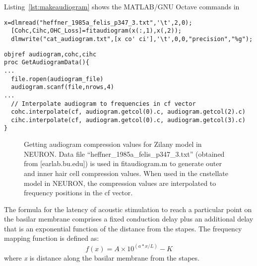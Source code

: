 
Listing~\ref{lst:makeaudiogram} shows the MATLAB/GNU Octave commands in
\begin{lstlisting}[label=lst:makeaudiogram,caption=Using \mbox{\textsf{fitaudiogram.m}} to create COHC and CIHC vectors for the cat.]
  x=dlmread("heffner_1985a_felis_p347_3.txt",'\t',2,0);
  [Cohc,Cihc,OHC_Loss]=fitaudiogram(x(:,1),x(,2));
  dlmwrite("cat_audiogram.txt",[x co' ci'],'\t',0,0,"precision","%g");
\end{lstlisting}



\begin{lstlisting}[label=lst:getaudiogramdata,caption= Procedure to get audiogram data and interpolate to frequencies in \textsf{cf} vector (\mbox{\textsf{Utilities.hoc}})]
objref audiogram,cohc,cihc
proc GetAudiogramData(){
...
  file.ropen(audiogram_file)
  audiogram.scanf(file,nrows,4)
...
  // Interpolate audiogram to frequencies in cf vector
  cohc.interpolate(cf, audiogram.getcol(0).c, audiogram.getcol(2).c)
  cihc.interpolate(cf, audiogram.getcol(0).c, audiogram.getcol(3).c)
}
\end{lstlisting}


\begin{figure}[th]
  \begin{center}
    \caption[Zilany auditory model conversion in NEURON]%
{Getting audiogram compression values for Zilany model in NEURON.
Data file \mbox{\textsf{``heffner\_1985a\_felis\_p347\_3.txt''}} (obtained from [earlab.bu.edu]) is used in \textsf{fitaudiogram.m} to generate outer and inner hair cell compression values.
When used in the \textsf{cnstellate} model in NEURON, the compression values are interpolated to frequency positions in the \textsf{cf} vector.
\label{fig:GetAudiogram}}
  \end{center}
\end{figure}




The formula for the latency of acoustic stimulation to reach a particular point on the basilar membrane comprises a fixed conduction delay plus an additional delay that is an exponential function of the distance from the stapes.
The frequency mapping function is defined as:
\begin{equation}
  \label{eq:BM}
  f(x) = A\times10^{\left(a * x / L\right)} - K
\end{equation}
\noindent where \emph{x} is distance along the basilar membrane from the stapes.

